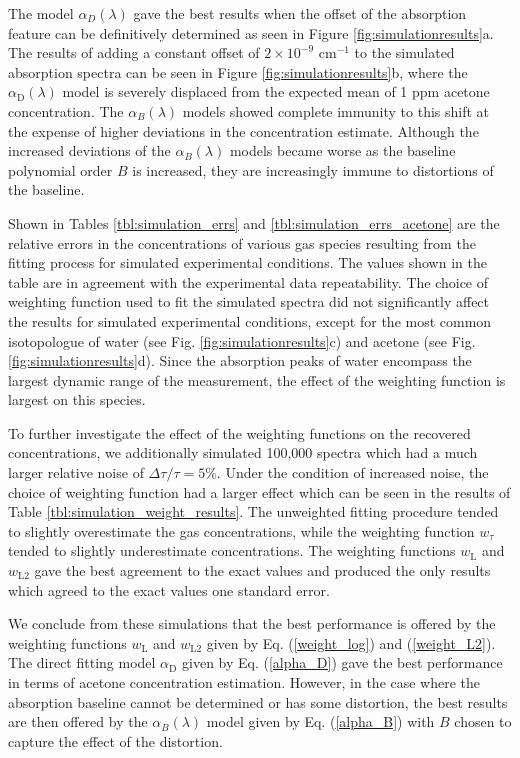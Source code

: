 \documentclass[8pt,a4paper]{report}
\begin{document}
	The model $\alpha_D(\lambda)$ gave the best results when the offset of the absorption feature can be definitively determined as seen in Figure \ref{fig:simulationresults}a. The results of adding a constant offset of $2\times 10^{-9}$ cm$^{-1}$ to the simulated absorption spectra can be seen in Figure \ref{fig:simulationresults}b, where the $\alpha_\mathrm{D}(\lambda)$ model is severely displaced from the expected mean of 1 ppm acetone concentration. The $\alpha_B(\lambda)$ models showed complete immunity to this shift at the expense of higher deviations in the concentration estimate. Although the increased deviations of the $\alpha_B(\lambda)$ models became worse as the baseline polynomial order $B$ is increased, they are increasingly immune to distortions of the baseline.
	
	Shown in Tables \ref{tbl:simulation_errs} and \ref{tbl:simulation_errs_acetone} are the relative errors in the concentrations of various gas species resulting from the fitting process for simulated experimental conditions. The values shown in the table are in agreement with the experimental data repeatability. The choice of weighting function used to fit the simulated spectra did not significantly affect the results for simulated experimental conditions, except for the most common isotopologue of water (see Fig. \ref{fig:simulationresults}c) and acetone (see Fig. \ref{fig:simulationresults}d). Since the absorption peaks of water encompass the largest dynamic range of the measurement, the effect of the weighting function is largest on this species.
	
	To further investigate the effect of the weighting functions on the recovered concentrations, we additionally simulated 100,000 spectra which had a much larger relative noise of $\Delta \tau /\tau = 5\%$. Under the condition of increased noise, the choice of weighting function had a larger effect which can be seen in the results of Table \ref{tbl:simulation_weight_results}. The unweighted fitting procedure tended to slightly overestimate the gas concentrations, while the weighting function $w_\tau$ tended to slightly underestimate concentrations. The weighting functions $w_\mathrm{L}$ and $w_\mathrm{L2}$ gave the best agreement to the exact values and produced the only results which agreed to the exact values one standard error. 
	
	We conclude from these simulations that the best performance is offered by the weighting functions $w_\mathrm{L}$ and $w_\mathrm{L2}$ given by Eq. (\ref{weight_log}) and (\ref{weight_L2}). The direct fitting model $\alpha_\mathrm{D}$ given by Eq. (\ref{alpha_D}) gave the best performance in terms of acetone concentration estimation. However, in the case where the absorption baseline cannot be determined or has some distortion, the best results are then offered by the $\alpha_B(\lambda)$ model given by Eq. (\ref{alpha_B}) with $B$ chosen to capture the effect of the distortion.
	
\end{document}
